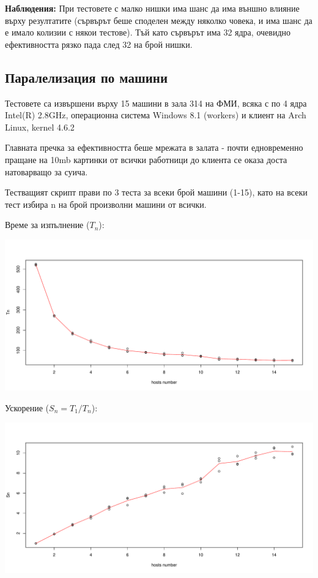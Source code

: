 \documentclass[12pt]{extarticle}
\begin{document}
\textbf{Наблюдения:} При тестовете с малко нишки има шанс да има
външно влияние върху резултатите (сървърът беше споделен между няколко
човека, и има шанс да е имало колизии с някои тестове). Тъй като
сървърът има 32 ядра, очевидно ефективността рязко пада след 32
на брой нишки.


\subsection{Паралелизация по машини}
Тестовете са извършени върху 15 машини в зала 314 на ФМИ,
всяка с по 4 ядра Intel(R) 2.8GHz, операционна система Windows 8.1
(workers) и клиент на Arch Linux, kernel 4.6.2

Главната пречка за ефективността беше мрежата в залата - почти
едновременно пращане на 10mb картинки от всички работници до клиента
се оказа доста натоварващо за суича.

Тестващият скрипт прави по 3 теста за всеки брой машини (1-15),
като на всеки тест избира n на брой произволни машини от всички.

\pagebreak
Време за изпълнение ($T_n$):
\begin{center}
\includegraphics[width=\textwidth]{host_graphs/Tn.pdf}
\end{center}

Ускорение ($S_n = T_1 / T_n$):
\begin{center}
\includegraphics[width=\textwidth]{host_graphs/Sn.pdf}
\end{center}
\end{document}
